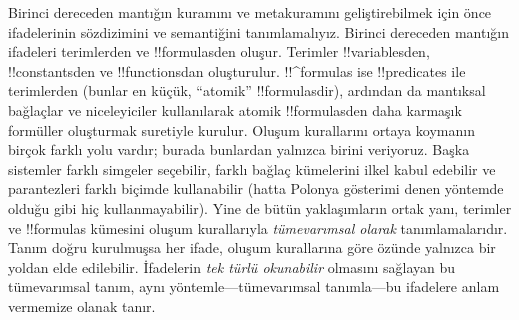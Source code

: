 \documentclass[../../../include/open-logic-section]{subfiles}
\begin{document}


Birinci dereceden mantığın kuramını ve metakuramını geliştirebilmek için
önce ifadelerinin sözdizimini ve semantiğini tanımlamalıyız. Birinci
dereceden mantığın ifadeleri terimlerden ve !!{formula}s{}den oluşur.
Terimler !!{variable}s{}den, !!{constant}s{}den ve !!{function}s{}dan
oluşturulur. !!^{formula}s ise !!{predicate}s ile terimlerden (bunlar en
küçük, ``atomik'' !!{formula}s{}dir), ardından da mantıksal
bağlaçlar ve niceleyiciler kullanılarak atomik !!{formula}s{}den daha
karmaşık formüller oluşturmak suretiyle kurulur. Oluşum kurallarını
ortaya koymanın birçok farklı yolu vardır; burada bunlardan yalnızca
birini veriyoruz. Başka sistemler farklı simgeler seçebilir, farklı
bağlaç kümelerini ilkel kabul edebilir ve parantezleri farklı biçimde
kullanabilir (hatta Polonya gösterimi denen yöntemde olduğu gibi hiç
kullanmayabilir). Yine de bütün yaklaşımların ortak yanı, terimler ve
!!{formula}s kümesini oluşum kurallarıyla \emph{tümevarımsal olarak}
tanımlamalarıdır. Tanım doğru kurulmuşsa her ifade, oluşum kurallarına
göre özünde yalnızca bir yoldan elde edilebilir. İfadelerin \emph{tek
türlü okunabilir} olmasını sağlayan bu tümevarımsal tanım, aynı
yöntemle---tümevarımsal tanımla---bu ifadelere anlam vermemize olanak
tanır.
\end{document}
